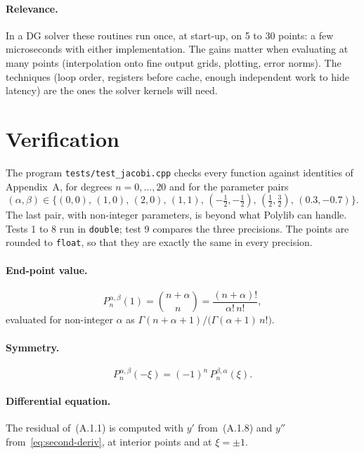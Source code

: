 \documentclass[11pt,a4paper]{article}
\newcommand{\Jac}[3]{P_{#1}^{#2,#3}}            %
\newcommand{\Pab}[1]{P_{#1}^{\alpha,\beta}}     %
\newcommand{\code}[1]{\texttt{#1}}
\begin{document}
\paragraph{Relevance.}
In a DG solver these routines run once, at start-up, on 5 to 30 points: a few
microseconds with either implementation. The gains matter when evaluating at many
points (interpolation onto fine output grids, plotting, error norms). The
techniques (loop order, registers before cache, enough independent work to
hide latency) are the ones the solver kernels will need.

\section{Verification}
\label{sec:tests}

The program \code{tests/test\_jacobi.cpp} checks every function against
identities of Appendix~A, for degrees $n=0,\dots,20$ and for the parameter
pairs
\begin{equation*}
  (\alpha,\beta)\in\bigl\{(0,0),\,(1,0),\,(2,0),\,(1,1),\,(-\tfrac12,-\tfrac12),\,
  (\tfrac12,\tfrac32),\,(0.3,-0.7)\bigr\}.
\end{equation*}
The last pair, with non-integer parameters, is beyond what Polylib can handle.
Tests 1 to 8 run in \code{double}; test 9 compares the three precisions. The
points are rounded to \code{float}, so that they are exactly the same in every
precision.

\paragraph{End-point value.}
\begin{equation}
  \Pab{n}(1) = \binom{n+\alpha}{n} = \frac{(n+\alpha)!}{\alpha!\,n!},
  \tag{A.1.5}
\end{equation}
evaluated for non-integer $\alpha$ as
$\Gamma(n+\alpha+1)/\bigl(\Gamma(\alpha+1)\,n!\bigr)$.

\paragraph{Symmetry.}
\begin{equation}
  \Pab{n}(-\xi) = (-1)^n\,\Jac{n}{\beta}{\alpha}(\xi).
  \tag{A.1.6}
\end{equation}

\paragraph{Differential equation.}
The residual of~(A.1.1) is computed with $y'$ from~(A.1.8) and $y''$
from~\eqref{eq:second-deriv}, at interior points and at $\xi=\pm1$.
\end{document}
